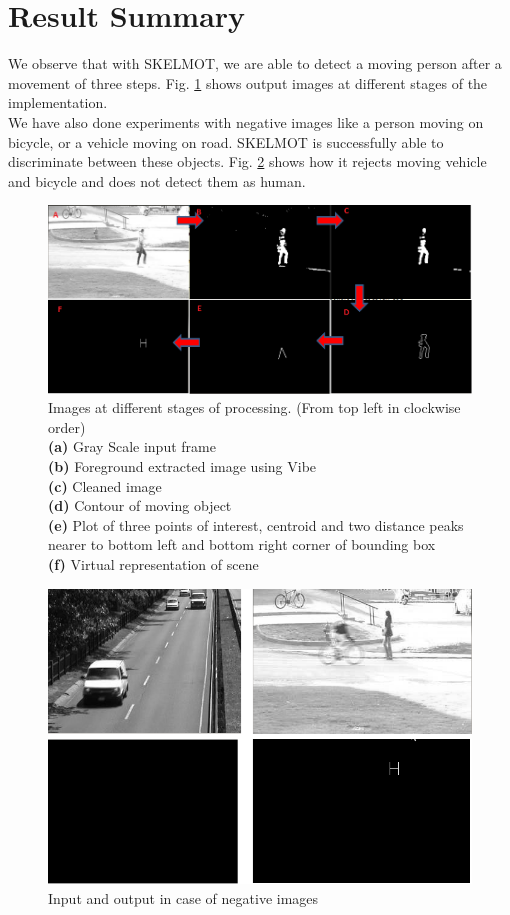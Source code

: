 \documentclass[a4paper, 12pt, twoside]{synopsis}  %
\begin{document}
\section {Result Summary}
\indent We observe that with SKELMOT, we are able to detect a moving person
after a movement of three steps. Fig.  \ref{pipeline_images} shows output
images at different stages of the implementation.\\
\indent We have also done experiments with negative images like a person
moving on bicycle, or a vehicle moving on road. SKELMOT is successfully able
to discriminate between these objects. Fig. \ref{negative_inputs} shows
how it rejects moving vehicle and bicycle and  does not detect them as
human.\\
\begin{figure}[!t]
\centering
\includegraphics[scale=0.50]{Figures/pipeline_images}
\caption{Images at different stages of processing. (From top left in
	clockwise order)\\
	\textbf{(a)} Gray Scale input frame\\
	\textbf{(b)} Foreground extracted image using Vibe\\
	\textbf{(c)} Cleaned image\\
	\textbf{(d)} Contour of moving object\\
	\textbf{(e)} Plot of three points of interest, centroid and two distance
peaks nearer to bottom left and bottom right corner of bounding box\\
\textbf{(f)} Virtual representation of scene} 
\label{pipeline_images}
\end{figure}
\begin{figure}[!b]
\centering
\includegraphics[scale=0.50]{Figures/negative_inputs}
\caption{Input and output in case of negative images}
\label{negative_inputs}
\end{figure}
\end{document}
